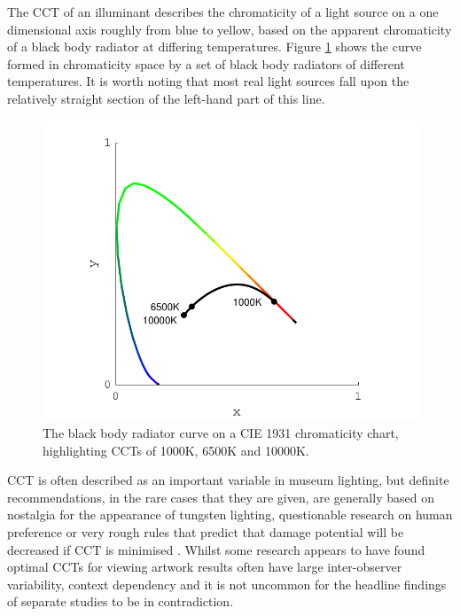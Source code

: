 The \acrfull{CCT} of an illuminant describes the chromaticity of a light source on a one dimensional axis roughly from blue to yellow, based on the apparent chromaticity of a black body radiator at differing temperatures. Figure \ref{fig:BBR} shows the curve formed in chromaticity space by a set of black body radiators of different temperatures. It is worth noting that most real light sources fall upon the relatively straight section of the left-hand part of this line.

\begin{figure}[htbp]
\includegraphics[max width=\textwidth]{figs/LitRev/BBR.pdf}
\caption{The black body radiator curve on a CIE 1931 chromaticity chart, highlighting \glspl{CCT} of 1000K, 6500K and 10000K.}
\label{fig:BBR}
\end{figure}

\Gls{CCT} is often described as an important variable in museum lighting, but definite recommendations, in the rare cases that they are given, are generally based on nostalgia for the appearance of tungsten lighting, questionable research on human preference \citep{kruithof_tubular_1941,fotios_revised_2017} or very rough rules that predict that damage potential will be decreased if \gls{CCT} is minimised \citep{cie_cie_2004}. Whilst some research appears to have found optimal \glspl{CCT} for viewing artwork \citep{nascimento_best_2014,pinto_correlated_2008,scuello_museum_2004,scuello_museum_2004-1, liu_cultural_2013,vidovszky-nemeth_introductory_2016,feltrin_impact_2019} results often have large inter-observer variability, context dependency and it is not uncommon for the headline findings of separate studies to be in contradiction. 

